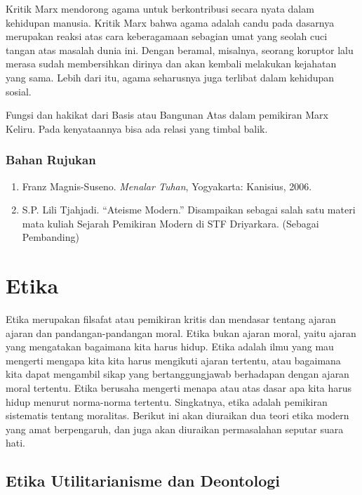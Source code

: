 \documentclass[11pt,twoside,a5paper,openany]{memoir}
\def\tightlist{}
\begin{document}
Kritik Marx mendorong agama untuk berkontribusi secara nyata dalam
kehidupan manusia. Kritik Marx bahwa agama adalah candu pada dasarnya
merupakan reaksi atas cara keberagamaan sebagian umat yang seolah cuci
tangan atas masalah dunia ini. Dengan beramal, misalnya, seorang
koruptor lalu merasa sudah membersihkan dirinya dan akan kembali
melakukan kejahatan yang sama. Lebih dari itu, agama seharusnya juga
terlibat dalam kehidupan sosial.

Fungsi dan hakikat dari Basis atau Bangunan Atas dalam pemikiran Marx
Keliru. Pada kenyataannya bisa ada relasi yang timbal balik.

\hypertarget{bahan-rujukan}{%
\subsection{Bahan Rujukan}\label{bahan-rujukan}}

\begin{enumerate}
\def\labelenumi{\arabic{enumi}.}
\tightlist
\item
  Franz Magnis-Suseno. \emph{Menalar Tuhan}, Yogyakarta: Kanisius, 2006.
\item
  S.P. Lili Tjahjadi. ``Ateisme Modern.'' Disampaikan sebagai salah satu
  materi mata kuliah Sejarah Pemikiran Modern di STF Driyarkara.
  (Sebagai Pembanding)
\end{enumerate}

\hypertarget{etika}{%
\chapter{Etika}\label{etika}}

Etika merupakan filsafat atau pemikiran kritis dan mendasar tentang
ajaran ajaran dan pandangan-pandangan moral. Etika bukan ajaran moral,
yaitu ajaran yang mengatakan bagaimana kita harus hidup. Etika adalah
ilmu yang mau mengerti mengapa kita kita harus mengikuti ajaran
tertentu, atau bagaimana kita dapat mengambil sikap yang
bertanggungjawab berhadapan dengan ajaran moral tertentu. Etika berusaha
mengerti menapa atau atas dasar apa kita harus hidup menurut norma-norma
tertentu. Singkatnya, etika adalah pemikiran sistematis tentang
moralitas. Berikut ini akan diuraikan dua teori etika modern yang amat
berpengaruh, dan juga akan diuraikan permasalahan seputar suara hati.

\hypertarget{etika-utilitarianisme-dan-deontologi}{%
\section{Etika Utilitarianisme dan
Deontologi}\label{etika-utilitarianisme-dan-deontologi}}
\end{document}

